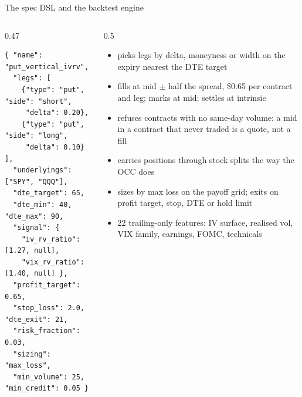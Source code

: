\documentclass[aspectratio=169,10pt]{beamer}
\begin{document}
\begin{frame}[fragile]{The spec DSL and the backtest engine}
  \begin{columns}[T]
    \begin{column}{0.47\textwidth}
      \vspace{0.4em}
\begin{lstlisting}
{ "name": "put_vertical_ivrv",
  "legs": [
    {"type": "put", "side": "short",
     "delta": 0.20},
    {"type": "put", "side": "long",
     "delta": 0.10} ],
  "underlyings": ["SPY", "QQQ"],
  "dte_target": 65,
  "dte_min": 40, "dte_max": 90,
  "signal": {
    "iv_rv_ratio":  [1.27, null],
    "vix_rv_ratio": [1.40, null] },
  "profit_target": 0.65,
  "stop_loss": 2.0, "dte_exit": 21,
  "risk_fraction": 0.03,
  "sizing": "max_loss",
  "min_volume": 25, "min_credit": 0.05 }
\end{lstlisting}
    \end{column}
    \begin{column}{0.5\textwidth}
      \begin{itemize}
        \item picks legs by delta, moneyness or width on the expiry nearest the DTE target
        \item fills at mid $\pm$ half the spread, \$0.65 per contract and leg; marks at mid; settles at intrinsic
        \item refuses contracts with no same-day volume: a mid in a contract that never traded is a quote, not a fill
        \item carries positions through stock splits the way the OCC does
        \item sizes by max loss on the payoff grid; exits on profit target, stop, DTE or hold limit
        \item 22 trailing-only features: IV surface, realised vol, VIX family, earnings, FOMC, technicals
      \end{itemize}
    \end{column}
  \end{columns}
\end{frame}
\end{document}
